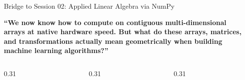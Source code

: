 \begin{frame}{Bridge to Session 02: Applied Linear Algebra via NumPy}
  \begin{center}
    \vspace{0.05cm}
    \begin{tcolorbox}[enhanced,arc=2mm,boxrule=.6pt,colback=UpGradNight,colframe=AWSSquid,
      left=5mm,right=5mm,top=2.5mm,bottom=2.5mm,width=0.92\linewidth]
      {\UpGradDisplayFont\fontsize{10.5}{14}\selectfont\bfseries\color{white}
        “We now know how to compute on contiguous multi-dimensional arrays at native hardware speed. But what do these arrays, matrices, and transformations actually mean geometrically when building machine learning algorithms?”
      }
    \end{tcolorbox}
  \end{center}
  \vspace{0.10cm}
  \begin{columns}[c,onlytextwidth]
    \begin{column}{0.31\textwidth}
    \end{column}
    \begin{column}{0.31\textwidth}
    \end{column}
    \begin{column}{0.31\textwidth}
    \end{column}
  \end{columns}
\end{frame}
